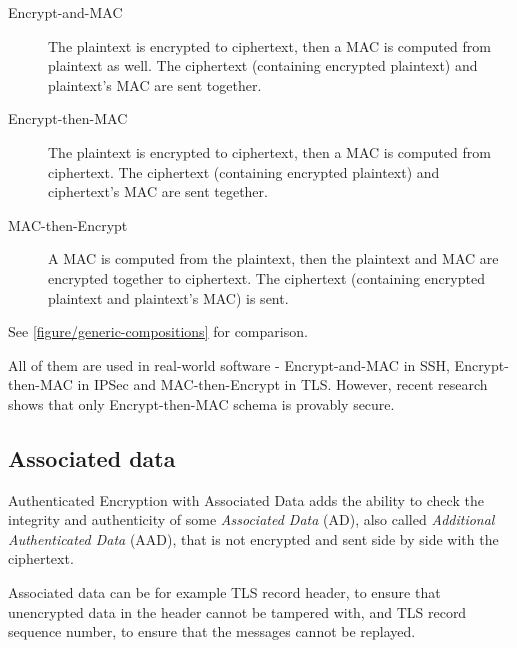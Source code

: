 \begin{description}
  \item[Encrypt-and-MAC] The plaintext is encrypted to ciphertext, then a MAC is computed from plaintext as well. The ciphertext (containing encrypted plaintext) and plaintext's MAC are sent together.
  \item[Encrypt-then-MAC] The plaintext is encrypted to ciphertext, then a MAC is computed from ciphertext. The ciphertext (containing encrypted plaintext) and ciphertext's MAC are sent tegether.
  \item[MAC-then-Encrypt] A MAC is computed from the plaintext, then the plaintext and MAC are encrypted together to ciphertext. The ciphertext (containing encrypted plaintext and plaintext's MAC) is sent.
\end{description}

See \autoref{figure/generic-compositions} for comparison.

All of them are used in real-world software - Encrypt-and-MAC in SSH, Encrypt-then-MAC in IPSec and MAC-then-Encrypt in TLS. However, recent research shows that only Encrypt-then-MAC schema is provably secure. \cite{generic-ae} \cite{generic-ae2}

\subsection{Associated data}

Authenticated Encryption with Associated Data adds the ability to check the integrity and authenticity of some \textit{Associated Data} (AD), also called \textit{Additional Authenticated Data} (AAD), that is not encrypted and sent side by side with the ciphertext.

Associated data can be for example TLS record header, to ensure that unencrypted data in the header cannot be tampered with, and TLS record sequence number, to ensure that the messages cannot be replayed.
